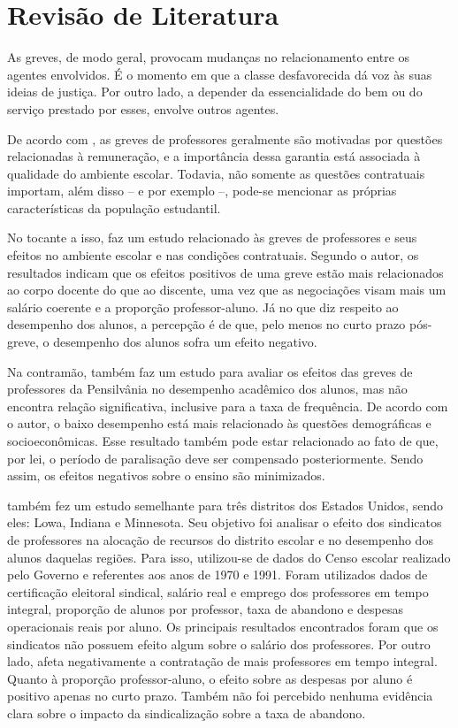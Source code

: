 \chapter{Revisão de Literatura}

As greves, de modo geral, provocam mudanças no relacionamento entre os agentes envolvidos. É o momento em que a classe desfavorecida dá voz às suas ideias de justiça. Por outro lado, a depender da essencialidade do bem ou do serviço prestado por esses, envolve outros agentes.

De acordo com , as greves de professores geralmente são motivadas por questões relacionadas à remuneração, e a importância dessa garantia está associada à qualidade do ambiente escolar. Todavia, não somente as questões contratuais importam, além disso – e por exemplo –, pode-se mencionar as próprias características da população estudantil.

No tocante a isso,  faz um estudo relacionado às greves de professores e seus efeitos no ambiente escolar e nas condições contratuais. Segundo o autor, os resultados indicam que os efeitos positivos de uma greve estão mais relacionados ao corpo docente do que ao discente, uma vez que as negociações visam mais um salário coerente e a proporção professor-aluno. Já no que diz respeito ao desempenho dos alunos, a percepção é de que, pelo menos no curto prazo pós-greve, o desempenho dos alunos sofra um efeito negativo.

Na contramão,  também faz um estudo para avaliar os efeitos das greves de professores da Pensilvânia no desempenho acadêmico dos alunos, mas não encontra relação significativa, inclusive para a taxa de frequência. De acordo com o autor, o baixo desempenho está mais relacionado às questões demográficas e socioeconômicas. Esse resultado também pode estar relacionado ao fato de que, por lei, o período de paralisação deve ser compensado posteriormente. Sendo assim, os efeitos negativos sobre o ensino são minimizados.

 também fez um estudo semelhante para três distritos dos Estados Unidos, sendo eles: Lowa, Indiana e Minnesota. Seu objetivo foi analisar o efeito dos sindicatos de professores na alocação de recursos do distrito escolar e no desempenho dos alunos daquelas regiões. Para isso, utilizou-se de dados do Censo escolar realizado pelo Governo e referentes aos anos de 1970 e 1991. Foram utilizados dados de certificação eleitoral sindical, salário real e emprego dos professores em tempo integral, proporção de alunos por professor, taxa de abandono e despesas operacionais reais por aluno. Os principais resultados encontrados foram que os sindicatos não possuem efeito algum sobre o salário dos professores. Por outro lado, afeta negativamente a contratação de mais professores em tempo integral. Quanto à proporção professor-aluno, o efeito sobre as despesas por aluno é positivo apenas no curto prazo. Também não foi percebido nenhuma evidência clara sobre o impacto da sindicalização sobre a taxa de abandono.

